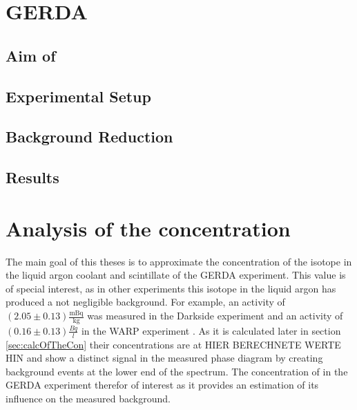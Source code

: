 
\section{GERDA}
\label{sec:GERDA}


\subsection{Aim of \GERDA}
\label{sec:AimGERDA}


\subsection{Experimental Setup}
\label{sec:ExSetup}


\subsection{Background Reduction}
\label{sec:BGReduction}


\subsection{Results}
\label{sec:ResultsofGERDA}


\section{Analysis of the  concentration}
\label{sec:AotKr}

The main goal of this theses is to approximate the concentration of the isotope  in the liquid argon coolant and scintillate of the GERDA experiment. 
This value is of special interest, as in other experiments this isotope in the liquid argon has produced a not negligible background. 
For example, an activity of \((2.05\pm0.13) \mathrm{\frac{mBq}{kg}}\) was measured in the Darkside experiment \cite{PhysRevD.93.081101} and an activity of \((0.16\pm0.13)\frac{Bq}{l}\) in the WARP experiment \cite{Benetti:2006az}. 
As it is calculated later in section \ref{sec:calcOfTheCon} their concentrations are at HIER BERECHNETE WERTE HIN and show a distinct signal in the measured phase diagram by creating background events at the lower end of the spectrum. 
The concentration of  in the GERDA experiment therefor of interest as it provides an estimation of its influence on the measured background.\\

